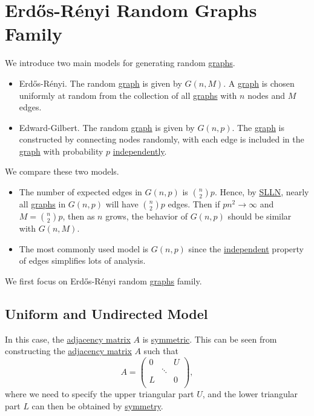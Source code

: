 \section{Erdős-Rényi Random Graphs Family}\label{sec:Erdos-Renyi-random-graphs-family}
We introduce two main models for generating random \hyperref[def:graph]{graphs}.
\begin{itemize}
	\item Erdős-Rényi. The random \hyperref[def:graph]{graph} is given by \(G(n, M)\). A \hyperref[def:graph]{graph} is chosen uniformly at random from the collection of all \hyperref[def:graph]{graphs} with \(n\) nodes and \(M\) edges.
	\item Edward-Gilbert. The random \hyperref[def:graph]{graph} is given by \(G(n, p)\). The \hyperref[def:graph]{graph} is constructed by connecting nodes randomly, with each edge is included in the \hyperref[def:graph]{graph} with probability \(p\) \hyperref[def:independent]{independently}.
\end{itemize}

\begin{remark}
	We compare these two models.
	\begin{itemize}
		\item The number of expected edges in \(G(n, p)\) is \(\binom{n}{2}p\). Hence, by \hyperref[thm:SLLN]{SLLN}, nearly all \hyperref[def:graph]{graphs} in \(G(n, p)\) will have \(\binom{n}{2}p\) edges. Then if \(pn^{2} \to \infty \) and \(M = \binom{n}{2}p\), then as \(n\) grows, the behavior of \(G(n, p)\) should be similar with \(G(n, M)\).
		\item The most commonly used model is \(G(n, p)\) since the \hyperref[def:independent]{independent} property of edges simplifies lots of analysis.
	\end{itemize}
\end{remark}

We first focus on Erdős-Rényi random \hyperref[def:graph]{graphs} family.

\subsection{Uniform and Undirected Model}\label{subsec:Uniform-and-Undirected-model}
In this case, the \hyperref[def:adjacency-matrix]{adjacency matrix} \(A\) is \hyperref[def:symmetric-matrix]{symmetric}. This can be seen from constructing the \hyperref[def:adjacency-matrix]{adjacency matrix} \(A\) such that
\[
	A = \begin{pmatrix}
		0 &        & U \\
		  & \ddots &   \\
		L &        & 0 \\
	\end{pmatrix},
\]
where we need to specify the upper triangular part \(U\), and the lower triangular part \(L\) can then be obtained by \hyperref[def:symmetric-matrix]{symmetry}.

